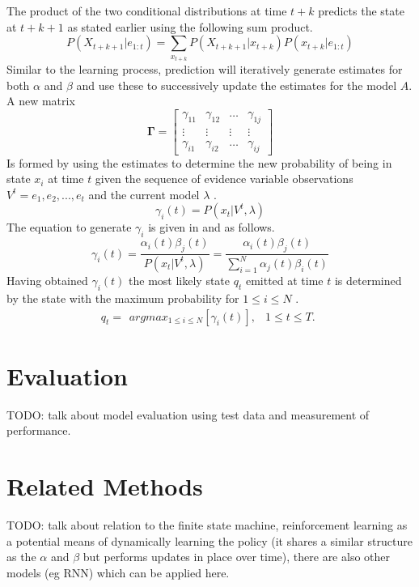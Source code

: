 \documentclass[11pt]{article}
\begin{document}
The product of the two conditional distributions at time $t+k$ predicts the state at $t+k+1$ as stated earlier using the following sum product.
$$
P(X_{t+k+1}|e_{1:t}) = \sum_{ x_{t+k} } P(X_{t+k+1} | x_{t+k}) P(x_{t+k}|e_{1:t}) 
$$
Similar to the learning process, prediction will iteratively generate estimates for both $\alpha$ and $\beta$ and use these to successively update the estimates for the model $A$. A new matrix 
\begin{equation*}
 \mathbf{\Gamma} = \left[
    \begin{array}{cccc}
    \gamma_{11} & \gamma_{12} & \ldots & \gamma_{1j} \\
    \vdots & \vdots & \vdots & \vdots \\
    \gamma_{i1} & \gamma_{i2} & \ldots & \gamma_{ij}
    \end{array}
    \right]
\end{equation*}
Is formed by using the estimates to determine the new probability of being in state $x_i$ at time $t$ given the sequence of evidence variable observations $V^t = e_1,e_2,...,e_t$ and the current model $\lambda$ \cite{rab}.
$$
\gamma_i(t) = P(x_t | V^t, \lambda)
$$
The equation to generate $\gamma_i$ is given in \cite{rab} and \cite{pc} as follows.
$$
\gamma_i(t) = \frac{\alpha_i(t)\beta_j(t)}{P(x_t | V^t, \lambda)} = \frac{\alpha_i(t)\beta_j(t)}{\sum_{i=1}^N \alpha_j(t)\beta_i(t)}
$$
Having obtained $\gamma_i(t)$ the most likely state $q_t$ emitted at time $t$ is determined by the state with the maximum probability for $1 \le i \le N$ \cite{rab}.
\begin{equation*}
q_t = \begin{array}{rl}
argmax_{1 \le i \le N}[\gamma_i(t)], & 1 \le t \le T.
 \end{array}
\end{equation*}


\section{Evaluation} 

TODO: talk about model evaluation using test data and measurement of performance.


\section{Related Methods}

TODO: talk about relation to the finite state machine, reinforcement learning as a potential means of dynamically learning the policy (it shares a similar structure as the $\alpha$ and $\beta$  but performs updates in place over time), there are also other models (eg RNN) which can be applied here.
         
\end{document}
